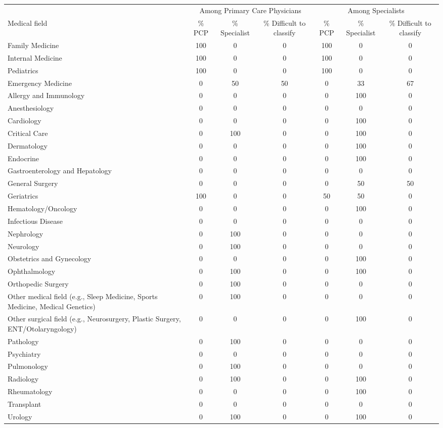 \begin{tabular}{lcccccc}\toprule
 & \multicolumn{3}{c}{Among Primary Care Physicians} & \multicolumn{3}{c}{Among Specialists} \\
\cmidrule(lr){2-4} \cmidrule(lr){5-7}
Medical field & \% PCP & \% Specialist & \% Difficult to classify & \% PCP & \% Specialist & \% Difficult to classify \\ \midrule
Family Medicine & 100 & 0 & 0 & 100 & 0 & 0 \\
Internal Medicine & 100 & 0 & 0 & 100 & 0 & 0 \\
Pediatrics & 100 & 0 & 0 & 100 & 0 & 0 \\
\midrule
Emergency Medicine & 0 & 50 & 50 & 0 & 33 & 67 \\
\midrule
Allergy and Immunology & 0 & 0 & 0 & 0 & 100 & 0 \\
Anesthesiology & 0 & 0 & 0 & 0 & 0 & 0 \\
Cardiology & 0 & 0 & 0 & 0 & 100 & 0 \\
Critical Care & 0 & 100 & 0 & 0 & 100 & 0 \\
Dermatology & 0 & 0 & 0 & 0 & 100 & 0 \\
Endocrine & 0 & 0 & 0 & 0 & 100 & 0 \\
Gastroenterology and Hepatology & 0 & 0 & 0 & 0 & 0 & 0 \\
General Surgery & 0 & 0 & 0 & 0 & 50 & 50 \\
Geriatrics & 100 & 0 & 0 & 50 & 50 & 0 \\
Hematology/Oncology & 0 & 0 & 0 & 0 & 100 & 0 \\
Infectious Disease & 0 & 0 & 0 & 0 & 0 & 0 \\
Nephrology & 0 & 100 & 0 & 0 & 0 & 0 \\
Neurology & 0 & 100 & 0 & 0 & 0 & 0 \\
Obstetrics and Gynecology & 0 & 0 & 0 & 0 & 100 & 0 \\
Ophthalmology & 0 & 100 & 0 & 0 & 100 & 0 \\
Orthopedic Surgery & 0 & 100 & 0 & 0 & 0 & 0 \\
Other medical field (e.g., Sleep Medicine, Sports Medicine, Medical Genetics) & 0 & 100 & 0 & 0 & 0 & 0 \\
Other surgical field (e.g., Neurosurgery, Plastic Surgery, ENT/Otolaryngology) & 0 & 0 & 0 & 0 & 100 & 0 \\
Pathology & 0 & 100 & 0 & 0 & 0 & 0 \\
Psychiatry & 0 & 0 & 0 & 0 & 0 & 0 \\
Pulmonology & 0 & 100 & 0 & 0 & 0 & 0 \\
Radiology & 0 & 100 & 0 & 0 & 100 & 0 \\
Rheumatology & 0 & 0 & 0 & 0 & 100 & 0 \\
Transplant & 0 & 0 & 0 & 0 & 0 & 0 \\
Urology & 0 & 100 & 0 & 0 & 100 & 0 \\
\bottomrule\end{tabular}
